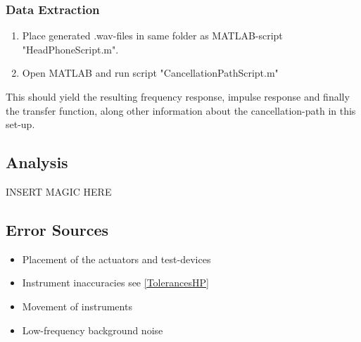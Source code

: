 \subsubsection{Data Extraction}
\begin{enumerate}
	\item Place generated .wav-files in same folder as MATLAB\textsuperscript{\textregistered}-script "HeadPhoneScript.m".
	\item Open MATLAB\textsuperscript{\textregistered} and run script "CancellationPathScript.m"
\end{enumerate}
This should yield the resulting frequency response, impulse response and finally the transfer function, along other information about the cancellation-path in this set-up.



\subsection{Analysis}
INSERT MAGIC HERE

\subsection{Error Sources}
\begin{itemize}
	\item Placement of the actuators and test-devices
	\item Instrument inaccuracies see \autoref{TolerancesHP}
	\item Movement of instruments
	\item Low-frequency background noise
\end{itemize}

